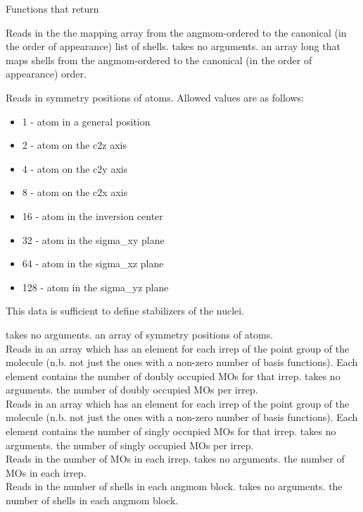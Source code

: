 \begin{center}
Functions that return 
\end{center}
{Reads in the the mapping array from the angmom-ordered
to the canonical (in the order of appearance) list of shells.}
{takes no arguments.}
{an array  long that maps shells from the angmom-ordered
to the canonical (in the order of appearance) order.}
{Reads in symmetry positions of atoms.
Allowed values are as follows:
\begin{itemize}
\item 1   - atom in a general position
\item 2   - atom on the c2z axis
\item 4   - atom on the c2y axis
\item 8   - atom on the c2x axis
\item 16  - atom in the inversion center
\item 32  - atom in the sigma\_xy plane
\item 64  - atom in the sigma\_xz plane
\item 128 - atom in the sigma\_yz plane
\end{itemize}
This data is sufficient to define stabilizers of the nuclei.}
{takes no arguments.}
{an array of symmetry positions of atoms.} \\
{Reads in an array which has an element for each irrep of the
point group of the molecule (n.b. not just the ones
with a non-zero number of basis functions). Each element
contains the number of doubly occupied MOs for that irrep.}
{takes no arguments.}
{the number of doubly occupied MOs per irrep.} \\
{Reads in an array which has an element for each irrep of the
point group of the molecule (n.b. not just the ones
with a non-zero number of basis functions).  Each element
contains the number of singly occupied MOs for that irrep.}
{takes no arguments.}
{the number of singly occupied MOs per irrep.} \\
{Reads in the number of MOs in each irrep.}
{takes no arguments.}
{the number of MOs in each irrep.} \\
{Reads in the number of shells in each angmom block.}
{takes no arguments.}
{the number of shells in each angmom block.} \\
